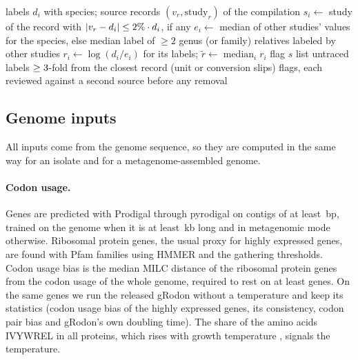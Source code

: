\begin{algorithm}[t]
\caption{Study-level label check}\label{alg:audit}
\footnotesize
\begin{algorithmic}[1]
\Require labels $d_i$ with species; source records $(v_r,\mathrm{study}_r)$ of the compilation
  \State $s_i\gets$ study of the record with $|v_r-d_i|\le2\%\cdot d_i$, if any
  \State $e_i\gets$ median of other studies' values for the species, else median label of $\ge 2$ genus (or family)
  relatives labeled by other studies
\EndFor
{}
  \State $r_i\gets\log(d_i/e_i)$ for its labels; $\tilde r\gets\operatorname{median}_i r_i$
   flag $s$ \EndIf
\EndFor
\State list untraced labels $\ge3$-fold from the closest record (unit or conversion slips)
\State \Return flags, each reviewed against a second source before any removal
\end{algorithmic}
\end{algorithm}

\subsection{Genome inputs}\label{sec:features}
All inputs come from the genome sequence, so they are computed in the same way for an isolate and for a
metagenome-assembled genome.

\paragraph{Codon usage.} Genes are predicted with Prodigal through pyrodigal \citep{hyatt2010,larralde2022} on contigs of
at least \MinContig\,bp, trained on the genome when it is at least \MinTrainKb\,kb long and in metagenomic mode otherwise.
Ribosomal protein genes, the usual proxy for highly expressed genes, are found with \NRibosomalFamilies Pfam families
\citep{mistry2021} using HMMER \citep{eddy2011} and the gathering thresholds. Codon usage bias is the median MILC distance
\citep{supek2005} of the ribosomal protein genes from the codon usage of the whole genome, required to rest on at least
\MinRibosomal genes. On the same genes we run the released gRodon \citep{weissman2021} without a temperature and keep its
\NGRodonFeaturesWord statistics (codon usage bias of the highly expressed genes, its consistency, codon pair bias and gRodon's
own doubling time). The share of the amino acids IVYWREL in all proteins, which rises with growth temperature
\citep{zeldovich2007}, signals the temperature.

